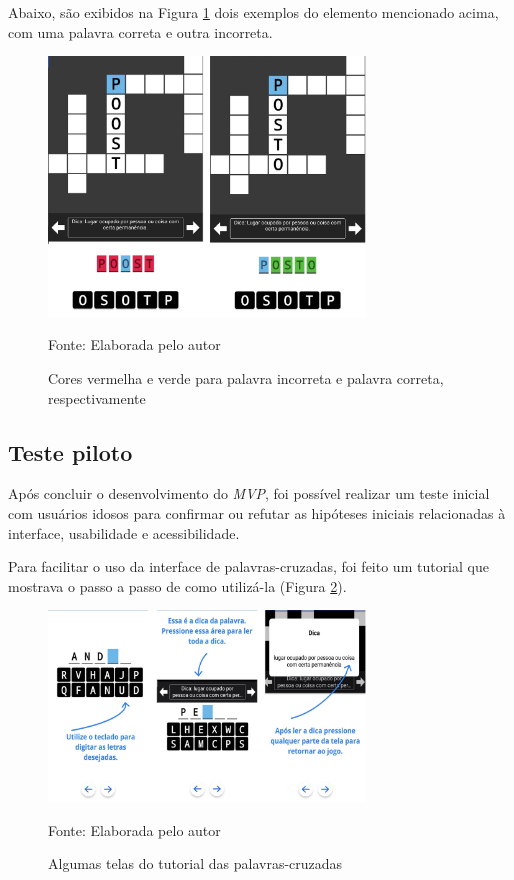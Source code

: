 Abaixo, são exibidos na Figura \ref{fig:verdevermelho} dois exemplos do elemento mencionado acima, com uma palavra correta e outra incorreta.

\begin{figure}[H]
\centering
    \caption{Cores vermelha e verde para palavra incorreta e palavra correta, respectivamente}
    \label{fig:verdevermelho}
    \includegraphics[width=0.75\textwidth]{Figuras/verdevermelho.jpg}
    
    Fonte: Elaborada pelo autor
\end{figure}


\subsection{Teste piloto}
Após concluir o desenvolvimento do \textit{MVP}, foi possível realizar um teste inicial com usuários idosos para confirmar ou refutar as hipóteses iniciais relacionadas à interface, usabilidade e acessibilidade.

Para facilitar o uso da interface de palavras-cruzadas, foi feito um tutorial que mostrava o passo a passo de como utilizá-la (Figura \ref{fig:tutorial}). 

\begin{figure}[H]
\centering
    \caption{Algumas telas do tutorial das palavras-cruzadas}
    \label{fig:tutorial}
    \includegraphics[width=0.75\textwidth]{Figuras/tutorial.jpg}
    
    Fonte: Elaborada pelo autor
\end{figure}

